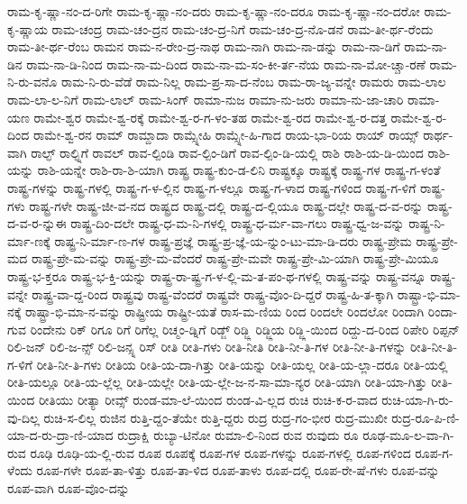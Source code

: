 {ರಾಮ-ಕೃ-ಷ್ಣಾ-ನಂ-ದ-ರಿಗೇ
ರಾಮ-ಕೃ-ಷ್ಣಾ-ನಂ-ದರು
ರಾಮ-ಕೃ-ಷ್ಣಾ-ನಂ-ದರೂ
ರಾಮ-ಕೃ-ಷ್ಣಾ-ನಂ-ದರೋ
ರಾಮ-ಕೃ-ಷ್ಣಾಯ
ರಾಮ-ಚಂದ್ರ
ರಾಮ-ಚಂ-ದ್ರನ
ರಾಮ-ಚಂ-ದ್ರ-ನಿಗೆ
ರಾಮ-ಚಂ-ದ್ರ-ನೊ-ಡನೆ
ರಾಮ-ತೀ-ರ್ಥ-ರೆಂದು
ರಾಮ-ತೀ-ರ್ಥ-ರೆಂಬ
ರಾಮನ
ರಾಮ-ನ-ರೇಂ-ದ್ರ-ನಾಥ
ರಾಮ-ನಾಗಿ
ರಾಮ-ನಾ-ಡನ್ನು
ರಾಮ-ನಾ-ಡಿಗೆ
ರಾಮ-ನಾ-ಡಿನ
ರಾಮ-ನಾ-ಡಿ-ನಿಂದ
ರಾಮ-ನಾ-ಮ-ದಿಂದ
ರಾಮ-ನಾ-ಮ-ಸಂ-ಕೀ-ರ್ತ-ನೆಯ
ರಾಮ-ನಾ-ಮೋ-ಚ್ಚಾ-ರಣೆ
ರಾಮ-ನಿ-ರು-ವನೊ
ರಾಮ-ನಿ-ರು-ವೆಡೆ
ರಾಮ-ನಿಲ್ಲ
ರಾಮ-ಪ್ರ-ಸಾ-ದ-ನೆಂಬ
ರಾಮ-ರಾ-ಜ್ಯ-ವನ್ನೇ
ರಾಮರು
ರಾಮ-ಲಾಲ
ರಾಮ-ಲಾ-ಲ-ನಿಗೆ
ರಾಮ-ಲಾಲ್
ರಾಮ-ಸಿಂಗ್
ರಾಮಾ-ನುಜ
ರಾಮಾ-ನು-ಜರು
ರಾಮಾ-ನು-ಜಾ-ಚಾರಿ
ರಾಮಾ-ಯಣ
ರಾಮೇ-ಶ್ವರ
ರಾಮೇ-ಶ್ವ-ರಕ್ಕೆ
ರಾಮೇ-ಶ್ವ-ರ-ಗ-ಳಂ-ತಹ
ರಾಮೇ-ಶ್ವ-ರದ
ರಾಮೇ-ಶ್ವ-ರ-ದತ್ತ
ರಾಮೇ-ಶ್ವ-ರ-ದಿಂದ
ರಾಮೇ-ಶ್ವ-ರನ
ರಾಮ್
ರಾಮ್ದಾದಾ
ರಾಮ್ಸ್ನೇಹಿ
ರಾಮ್ಸ್ನೇ-ಹಿ-ಗಾದ
ರಾಯ-ಭಾ-ರಿಯ
ರಾಯ್
ರಾಯ್ಸ್
ರಾರ್ಥ-ವಾಗಿ
ರಾಲ್ಫ್
ರಾಲ್ಫ್ನಿಗೆ
ರಾವಲ್
ರಾವ-ಲ್ಪಿಂಡಿ
ರಾವ-ಲ್ಪಿಂ-ಡಿಗೆ
ರಾವ-ಲ್ಪಿಂ-ಡಿ-ಯಲ್ಲಿ
ರಾಶಿ
ರಾಶಿ-ಯ-ಡಿ-ಯಿಂದ
ರಾಶಿ-ಯನ್ನು
ರಾಶಿ-ಯನ್ನೇ
ರಾಶಿ-ರಾ-ಶಿ-ಯಾಗಿ
ರಾಷ್ಟ್ರ
ರಾಷ್ಟ್ರ-ಕುಂ-ಡ-ಲಿನಿ
ರಾಷ್ಟ್ರಕ್ಕೂ
ರಾಷ್ಟ್ರಕ್ಕೆ
ರಾಷ್ಟ್ರ-ಗಳ
ರಾಷ್ಟ್ರ-ಗ-ಳಂತೆ
ರಾಷ್ಟ್ರ-ಗಳನ್ನು
ರಾಷ್ಟ್ರ-ಗಳಲ್ಲಿ
ರಾಷ್ಟ್ರ-ಗ-ಳ-ಲ್ಲಿನ
ರಾಷ್ಟ್ರ-ಗ-ಳಲ್ಲೂ
ರಾಷ್ಟ್ರ-ಗ-ಳಾದ
ರಾಷ್ಟ್ರ-ಗಳಿಂದ
ರಾಷ್ಟ್ರ-ಗ-ಳಿಗೆ
ರಾಷ್ಟ್ರ-ಗಳು
ರಾಷ್ಟ್ರ-ಗಳೇ
ರಾಷ್ಟ್ರ-ಜೀ-ವ-ನದ
ರಾಷ್ಟ್ರದ
ರಾಷ್ಟ್ರ-ದಲ್ಲಿ
ರಾಷ್ಟ್ರ-ದ-ಲ್ಲಿಯೂ
ರಾಷ್ಟ್ರ-ದಲ್ಲೇ
ರಾಷ್ಟ್ರ-ದ-ವ-ರನ್ನು
ರಾಷ್ಟ್ರ-ದ-ವ-ರ-ನ್ನುಈ
ರಾಷ್ಟ್ರ-ದಿಂ-ದಲೇ
ರಾಷ್ಟ್ರ-ಧ-ಮ-ನಿ-ಗಳಲ್ಲಿ
ರಾಷ್ಟ್ರ-ಧ-ರ್ಮ-ವಾ-ಗಲು
ರಾಷ್ಟ್ರ-ಧ್ವ-ಜ-ವನ್ನು
ರಾಷ್ಟ್ರ-ನಿ-ರ್ಮಾ-ಣಕ್ಕೆ
ರಾಷ್ಟ್ರ-ನಿ-ರ್ಮಾ-ಣ-ಗಳ
ರಾಷ್ಟ್ರ-ಪ್ರಜ್ಞೆ
ರಾಷ್ಟ್ರ-ಪ್ರ-ಜ್ಞೆ-ಯ-ನ್ನುಂ-ಟು-ಮಾ-ಡಿ-ದರು
ರಾಷ್ಟ್ರ-ಪ್ರೇಮ
ರಾಷ್ಟ್ರ-ಪ್ರೇ-ಮದ
ರಾಷ್ಟ್ರ-ಪ್ರೇ-ಮ-ವನ್ನು
ರಾಷ್ಟ್ರ-ಪ್ರೇ-ಮ-ವೆಂದರೆ
ರಾಷ್ಟ್ರ-ಪ್ರೇ-ಮವೇ
ರಾಷ್ಟ್ರ-ಪ್ರೇ-ಮಿ-ಯಾಗಿ
ರಾಷ್ಟ್ರ-ಪ್ರೇ-ಮಿಯೂ
ರಾಷ್ಟ್ರ-ಭ-ಕ್ತರೂ
ರಾಷ್ಟ್ರ-ಭ-ಕ್ತಿ-ಯನ್ನು
ರಾಷ್ಟ್ರ-ರಾ-ಷ್ಟ್ರ-ಗ-ಳ-ಲ್ಲಿ-ಮ-ತ-ಪಂ-ಥ-ಗಳಲ್ಲಿ
ರಾಷ್ಟ್ರ-ವನ್ನು
ರಾಷ್ಟ್ರ-ವನ್ನೂ
ರಾಷ್ಟ್ರ-ವನ್ನೇ
ರಾಷ್ಟ್ರ-ವಾ-ದ್ದ-ರಿಂದ
ರಾಷ್ಟ್ರವು
ರಾಷ್ಟ್ರ-ವೆಂದರೆ
ರಾಷ್ಟ್ರವೇ
ರಾಷ್ಟ್ರ-ವೊಂ-ದಿ-ದ್ದರೆ
ರಾಷ್ಟ್ರ-ಹಿ-ತ-ಕ್ಕಾಗಿ
ರಾಷ್ಟ್ರಾ-ಭಿ-ಮಾ-ನಕ್ಕೆ
ರಾಷ್ಟ್ರಾ-ಭಿ-ಮಾ-ನ-ವನ್ನು
ರಾಷ್ಟ್ರೀಯ
ರಾಷ್ಟ್ರೀ-ಯತೆ
ರಾಸ-ಮ-ಣಿಯ
ರಿಂದ
ರಿಂದಲೇ
ರಿಂದಲೋ
ರಿಂದಾಗಿ
ರಿಂದಾ-ಗುವ
ರಿಂದೇನು
ರಿಕ್
ರಿಗೂ
ರಿಗೆ
ರಿಗೆಲ್ಲ
ರಿಚ್ಮಂ-ಡ್ನಿಗೆ
ರಿಡ್ಜ್
ರಿಡ್ಜ್ಲಿ
ರಿಡ್ಜ್ಲಿಯ
ರಿಡ್ಜ್ಲಿ-ಯಿಂದ
ರಿದ್ದು-ದ-ರಿಂದ
ರಿಪೇರಿ
ರಿಪ್ಪನ್
ರಿಲಿ-ಜನ್
ರಿಲಿ-ಜ-ನ್ಸ್
ರಿಲಿ-ಜನ್ಸ್ನ
ರಿಸ್
ರೀತಿ
ರೀತಿ-ಗಳು
ರೀತಿ-ನೀತಿ
ರೀತಿ-ನೀ-ತಿ-ಗಳ
ರೀತಿ-ನೀ-ತಿ-ಗಳನ್ನು
ರೀತಿ-ನೀ-ತಿ-ಗ-ಳಿಗೆ
ರೀತಿ-ನೀ-ತಿ-ಗಳು
ರೀತಿಯ
ರೀತಿ-ಯ-ದಾ-ಗಿತ್ತು
ರೀತಿ-ಯನ್ನು
ರೀತಿ-ಯಲ್ಲ
ರೀತಿ-ಯ-ಲ್ಲಾ-ದರೂ
ರೀತಿ-ಯಲ್ಲಿ
ರೀತಿ-ಯಲ್ಲೂ
ರೀತಿ-ಯ-ಲ್ಲೆಲ್ಲ
ರೀತಿ-ಯಲ್ಲೇ
ರೀತಿ-ಯ-ಲ್ಲೇ-ಜ-ನ-ಸಾ-ಮಾ-ನ್ಯರ
ರೀತಿ-ಯಾಗಿ
ರೀತಿ-ಯಾ-ಗಿತ್ತು
ರೀತಿ-ಯಿಂದ
ರೀತಿಯು
ರೀತ್ಯಾ
ರೀವ್ಸ್
ರುಂಡ-ಮಾ-ಲೆ-ಯಿಂದ
ರುಂಡ-ವಿ-ಲ್ಲದ
ರುಚಿ
ರುಚಿ-ಕ-ರ-ವಾದ
ರುಚಿ-ಯಾ-ಗಿ-ರು-ವು-ದಿಲ್ಲ
ರುಚಿ-ಸ-ಲಿಲ್ಲ
ರುಜಿನ
ರುತ್ತಿ-ದ್ದಂ-ತೆಯೇ
ರುತ್ತಿ-ದ್ದರು
ರುದ್ರ
ರುದ್ರ-ಗಂ-ಭೀರ
ರುದ್ರ-ಮುಖೀ
ರುದ್ರ-ರೂ-ಪಿ-ಣಿ-ಯಾ-ದ-ರು-ದ್ರಾ-ಣಿ-ಯಾದ
ರುದ್ರಾಕ್ಷಿ
ರುಬ್ಯಾ-ಟಿನೋ
ರುಮಾ-ಲಿ-ನಿಂದ
ರುವ
ರುವುದು
ರೂ
ರೂಢ-ಮೂ-ಲ-ವಾ-ಗಿ-ರುವ
ರೂಢಿ
ರೂಢಿ-ಯ-ಲ್ಲಿ-ರುವ
ರೂಪ
ರೂಪಕ್ಕೆ
ರೂಪ-ಗಳ
ರೂಪ-ಗಳನ್ನು
ರೂಪ-ಗಳಲ್ಲಿ
ರೂಪ-ಗಳಿಂದ
ರೂಪ-ಗ-ಳೆಂದು
ರೂಪ-ಗಳೇ
ರೂಪ-ತಾ-ಳಿತ್ತು
ರೂಪ-ತಾ-ಳಿದ
ರೂಪ-ತಾಳು
ರೂಪ-ದಲ್ಲಿ
ರೂಪ-ರೇ-ಷೆ-ಗಳು
ರೂಪ-ವನ್ನು
ರೂಪ-ವಾಗಿ
ರೂಪ-ವೊಂ-ದನ್ನು
}
